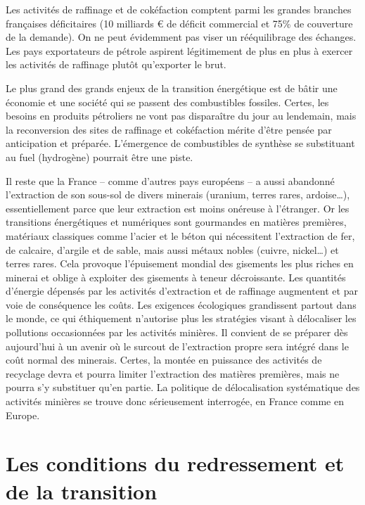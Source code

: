 \documentclass[a4paper]{article}
\begin{document}
Les activités de raffinage et de cokéfaction comptent parmi les grandes branches françaises déficitaires (10 milliards € de déficit commercial et 75\% de couverture de la demande). On ne peut évidemment pas viser un rééquilibrage des échanges.  Les pays exportateurs de pétrole aspirent légitimement de plus en plus à exercer les activités de raffinage plutôt qu’exporter le brut. 

Le plus grand des grands enjeux de la transition énergétique est de bâtir une économie et une société qui se passent des combustibles fossiles. Certes, les besoins en produits pétroliers ne vont pas disparaître du jour au lendemain, mais la reconversion des sites de raffinage et cokéfaction mérite d’être pensée par anticipation et préparée. L’émergence de combustibles de synthèse  se substituant au fuel (hydrogène) pourrait être une piste.

Il reste que la France – comme d’autres pays européens – a aussi abandonné l’extraction de son sous-sol de divers minerais (uranium, terres rares, ardoise…), essentiellement parce que leur extraction est moins onéreuse à l’étranger. Or les transitions énergétiques et numériques sont gourmandes en matières premières, matériaux classiques comme l’acier et le béton qui nécessitent l’extraction de fer, de calcaire, d’argile et de sable, mais aussi métaux nobles (cuivre, nickel…) et terres rares. Cela provoque l’épuisement mondial des gisements les plus riches en minerai et oblige à exploiter des gisements à teneur décroissante. Les quantités d’énergie dépensés par les activités d’extraction et  de raffinage augmentent et par voie de conséquence les coûts. Les exigences écologiques grandissent partout dans le monde, ce qui éthiquement n’autorise plus les stratégies visant à délocaliser les pollutions occasionnées par les activités minières. Il convient de se préparer dès aujourd’hui à un avenir où le surcout de l’extraction propre sera intégré dans le coût normal des minerais. Certes, la montée en puissance des activités de recyclage devra et pourra limiter l’extraction des matières premières, mais ne pourra s’y substituer qu’en partie. La politique de délocalisation systématique des activités minières se trouve donc sérieusement interrogée, en France comme en Europe.  

\section{Les conditions du redressement et de la transition}
\end{document}
